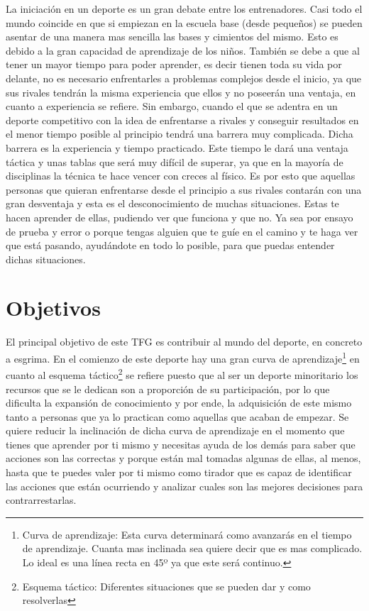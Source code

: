 La iniciación en un deporte es un gran debate entre los entrenadores. Casi todo el mundo coincide en que si empiezan en la escuela base (desde pequeños) se pueden
asentar de una manera mas sencilla las bases y cimientos del mismo. Esto es debido
a la gran capacidad de aprendizaje de los niños. También se debe a que al tener
un mayor tiempo para poder aprender, es decir tienen toda su vida por delante,
no es necesario enfrentarles a problemas complejos desde el inicio, ya que
sus rivales tendrán la misma experiencia que ellos y no poseerán una
ventaja, en cuanto a experiencia se refiere. Sin embargo, cuando el que se adentra
en un deporte competitivo con la idea de enfrentarse a rivales y conseguir resultados
en el menor tiempo posible al principio tendrá una barrera muy complicada. Dicha barrera
es la experiencia y tiempo practicado. Este tiempo le dará una ventaja táctica y unas tablas
que será muy difícil de superar, ya que en la mayoría de disciplinas la técnica
te hace vencer con creces al físico. Es por esto que aquellas personas que
quieran enfrentarse desde el principio a sus rivales contarán con una gran
desventaja y esta es el desconocimiento de muchas situaciones. Estas
te hacen aprender de ellas, pudiendo ver que funciona y que no. Ya sea por
ensayo de prueba y error o porque tengas alguien que te guíe en el camino
y te haga ver que está pasando, ayudándote en todo lo posible, para que puedas entender dichas situaciones.

\section{Objetivos}

El principal objetivo de este \acs{TFG} es contribuir al mundo del deporte, en concreto a esgrima. En el comienzo de este deporte hay una gran curva de aprendizaje\footnote{Curva de aprendizaje: Esta curva determinará como avanzarás en el tiempo de aprendizaje. Cuanta mas inclinada sea quiere decir que es mas complicado. Lo ideal es una línea recta en 45º ya que este será continuo. }
 en cuanto al esquema táctico\footnote{Esquema táctico: Diferentes situaciones que se pueden dar y como resolverlas} se refiere puesto que al ser un deporte minoritario los
 recursos que se le dedican son a proporción de su participación, por lo que dificulta la expansión de conocimiento
 y por ende, la adquisición de este mismo tanto a personas que ya lo practican como aquellas
 que acaban de empezar. Se quiere reducir la inclinación de dicha curva de aprendizaje
 en el momento que tienes que aprender por ti mismo y necesitas ayuda de los demás
 para saber que acciones son las correctas y porque están mal tomadas algunas de ellas,
 al menos, hasta que te puedes valer por ti mismo como tirador que es capaz de identificar
 las acciones que están ocurriendo y analizar cuales son las mejores decisiones para contrarrestarlas.

